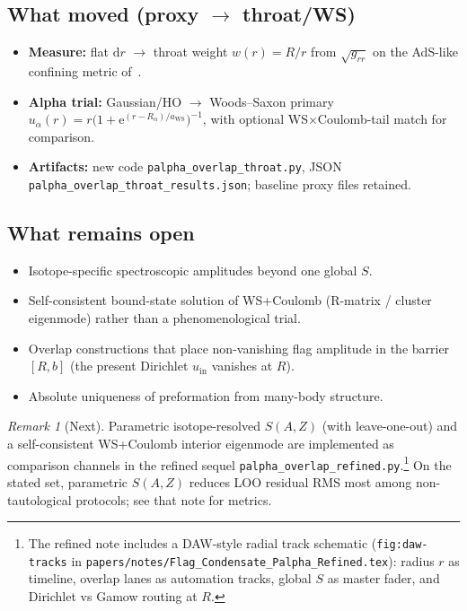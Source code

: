 \documentclass[11pt,a4paper]{article}
\theoremstyle{remark}
\newtheorem*{remark}{Remark}
\newcommand{\dd}{\mathrm{d}}
\newcommand{\ee}{\mathrm{e}}
\begin{document}
\subsection{What moved (proxy $\to$ throat/WS)}
\begin{itemize}
\item \textbf{Measure:} flat $\dd r$ $\to$ throat weight $w(r)=R/r$
  from $\sqrt{g_{rr}}$ on the AdS-like confining metric of~\cite{NuclearDecay2026}.
\item \textbf{Alpha trial:} Gaussian/HO $\to$ Woods--Saxon primary
  $u_\alpha(r)=r\bigl(1+\ee^{(r-R_\alpha)/a_{\mathrm{WS}}}\bigr)^{-1}$,
  with optional WS$\times$Coulomb-tail match for comparison.
\item \textbf{Artifacts:} new code
  \texttt{palpha\_overlap\_throat.py}, JSON
  \nolinkurl{palpha_overlap_throat_results.json}; baseline proxy files
  retained.
\end{itemize}

\subsection{What remains open}
\begin{itemize}
\item Isotope-specific spectroscopic amplitudes beyond one global $S$.
\item Self-consistent bound-state solution of WS+Coulomb (R-matrix /
  cluster eigenmode) rather than a phenomenological trial.
\item Overlap constructions that place non-vanishing flag amplitude in
  the barrier $[R,b]$ (the present Dirichlet $u_{\mathrm{in}}$ vanishes
  at $R$).
\item Absolute uniqueness of preformation from many-body structure.
\end{itemize}

\begin{remark}[Next]
Parametric isotope-resolved $S(A,Z)$ (with leave-one-out) and a
self-consistent WS+Coulomb interior eigenmode are implemented as
comparison channels in the refined sequel
\nolinkurl{palpha_overlap_refined.py}.\footnote{The refined note includes a
DAW-style radial track schematic (\texttt{fig:daw-tracks} in
\nolinkurl{papers/notes/Flag_Condensate_Palpha_Refined.tex}): radius $r$ as timeline,
overlap lanes as automation tracks, global $S$ as master fader, and
Dirichlet vs Gamow routing at $R$.}
On the stated set, parametric
$S(A,Z)$ reduces LOO residual RMS most among non-tautological protocols;
see that note for metrics.
\end{remark}
\end{document}
